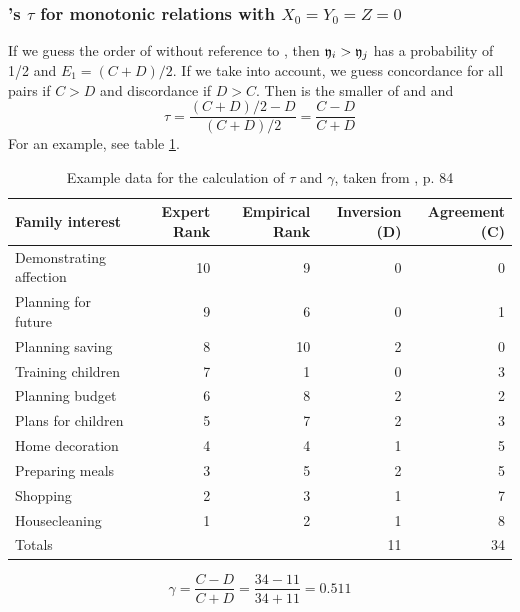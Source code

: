 \begin{refsection}
\subsubsection{'s \(\tau \) for monotonic relations with \(X_0 = Y_0 = Z = 0 \)}

If we guess the order of  without reference to , then \(\mathfrak{y}_i > \mathfrak{y}_j \) has a probability of 1/2 and \(E_1 = (C+D)/2 \). If we take  into account, we guess concordance for all pairs if \(C>D \) and discordance if \(D>C \). Then  is the smaller of  and  and
\begin{equation}
  \tau = \frac{(C+D)/2 - D}{(C+D)/2} = \frac{C-D}{C+D}
\end{equation}
For an example, see table \ref{tab:ExampleGamma}.

\begin{table}
  \caption{Example data for the calculation of \(\tau \) and \(\gamma \), taken from \parencite{Fre-65}, p. 84}
  \label{tab:ExampleGamma}
  \centering
    \begin{tabular}{lrrrr}
      \toprule
      Family interest & Expert Rank & Empirical Rank & Inversion (D) & Agreement (C) \\
      \midrule
      Demonstrating affection & 10 &  9 &  0 &  0 \\
      Planning for future     &  9 &  6 &  0 &  1 \\
      Planning saving         &  8 & 10 &  2 &  0 \\
      Training children       &  7 &  1 &  0 &  3 \\
      Planning budget         &  6 &  8 &  2 &  2 \\
      Plans for children      &  5 &  7 &  2 &  3 \\
      Home decoration         &  4 &  4 &  1 &  5 \\
      Preparing meals         &  3 &  5 &  2 &  5 \\
      Shopping                &  2 &  3 &  1 &  7 \\
      Housecleaning           &  1 &  2 &  1 &  8 \\
      \midrule
      Totals                  &    &    & 11 & 34 \\
      \bottomrule
    \end{tabular}
    \begin{equation}
      \gamma = \frac{C-D}{C+D} = \frac{34-11}{34+11} = 0.511
    \end{equation}
\end{table}


\end{refsection}
